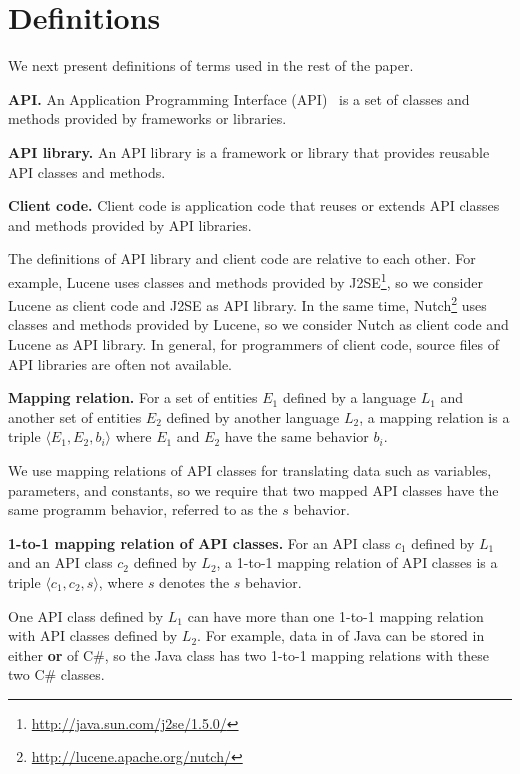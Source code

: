 \section{Definitions}
\label{sec:mapping}

We next present definitions of terms used in the rest of the paper.

\textbf{API.} An Application Programming Interface (API)~\cite{orenstein2000quickstudy}
is a set of classes and methods provided by frameworks or libraries.

\textbf{API library.} An API library is a framework
or library that provides reusable API classes and methods.

\textbf{Client code.} Client code is application code
that reuses or extends API classes and methods provided by API
libraries.

The definitions of API library and client code are
relative to each other. For example, Lucene uses classes and methods provided by
J2SE\footnote{\url{http://java.sun.com/j2se/1.5.0/}}, so we consider Lucene as client code and J2SE as API library. In the same time, Nutch\footnote{\url{http://lucene.apache.org/nutch/}} uses classes and methods provided by Lucene, so we consider Nutch as client code and Lucene as API library. In
general, for programmers of client code, source files of API libraries are often
not available.

\textbf{Mapping relation.} For a set of entities $E_1$ defined by a
language $L_1$ and another set of entities $E_2$ defined by another
language $L_2$, a mapping relation is a triple $\langle E_1, E_2,
b_i \rangle$ where $E_1$ and $E_2$ have the same behavior $b_i$.


We use mapping relations of API classes for translating data such as
variables, parameters, and constants, so we require that two mapped
API classes have the same programm behavior, referred to as
the $s$ behavior.

\textbf{1-to-1 mapping relation of API classes.} For an API class
$c_1$ defined by $L_1$ and an API class $c_2$ defined by $L_2$, a
1-to-1 mapping relation of API classes is a triple $\langle c_1,
c_2, s \rangle$, where $s$ denotes the $s$ behavior.

One API class defined by $L_1$ can have more than one 1-to-1 mapping
relation with API classes defined by $L_2$. For example, data in
 of Java can be stored in either
 \textbf{or}
 of C\#, so the Java class
has two 1-to-1 mapping relations with these two C\# classes.

